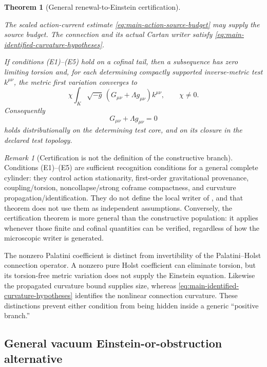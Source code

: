 \documentclass[11pt]{article}
\newtheorem{theorem}{Theorem}[section]
\theoremstyle{definition}
\theoremstyle{remark}
\newtheorem{remark}[remark]{Remark}
\begin{document}
\begin{theorem}[General renewal-to-Einstein certification]
\begin{enumerate}[label=\textup{(E\arabic*)},leftmargin=3em]
      The scaled action-current estimate
      \eqref{eq:main-action-source-budget} may supply the source budget.
      The connection and its actual Cartan writer satisfy
      \eqref{eq:main-identified-curvature-hypotheses}.
\end{enumerate}
If conditions \textup{(E1)--(E5)} hold on a cofinal tail, then a subsequence
has zero limiting torsion and, for each determining compactly supported
inverse-metric test $k^{\mu\nu}$, the metric first variation converges to
\begin{equation}
 \boxed{\chi\int_K\sqrt{-g}\,
       (G_{\mu\nu}+\Lambda g_{\mu\nu})k^{\mu\nu},\qquad \chi\ne0.}
 \label{eq:main-einstein-variation}
\end{equation}
Consequently
\begin{equation}
 \boxed{G_{\mu\nu}+\Lambda g_{\mu\nu}=0}
 \label{eq:main-vacuum-einstein}
\end{equation}
holds distributionally on the determining test core, and on its closure in
the declared test topology.
\end{theorem}

\begin{remark}[Certification is not the definition of the constructive branch]
\label{rem:main-certification-not-tautology}
Conditions \textup{(E1)--(E5)} are sufficient recognition conditions for a
general complete cylinder: they control action stationarity, first-order
gravitational provenance, coupling/torsion, noncollapse/strong coframe
compactness, and curvature propagation/identification.  They do not define
the local writer of , and that theorem does not use
them as independent assumptions.  Conversely, the certification theorem is
more general than the constructive population: it applies whenever those
finite and cofinal quantities can be verified, regardless of how the
microscopic writer is generated.
\end{remark}

The nonzero Palatini coefficient is distinct from invertibility of the
Palatini--Holst connection operator.  A nonzero pure Holst coefficient can
eliminate torsion, but its torsion-free metric variation does not supply the
Einstein equation.  Likewise the propagated curvature bound supplies size,
whereas \eqref{eq:main-identified-curvature-hypotheses} identifies the nonlinear
connection curvature.  These distinctions prevent either condition from being
hidden inside a generic ``positive branch.''

\subsection{General vacuum Einstein-or-obstruction alternative}
\end{document}
